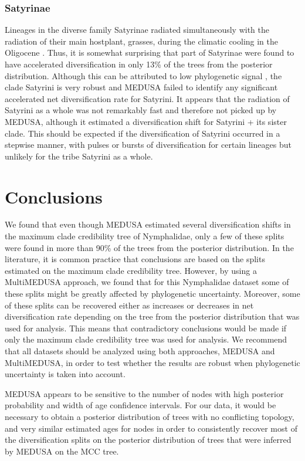 \documentclass[10pt]{article}
\begin{document}
\subsubsection*{Satyrinae}

Lineages in the diverse family Satyrinae radiated simultaneously with
the radiation of their main hostplant, grasses, during the climatic
cooling in the Oligocene \cite{pena2008}. Thus, it is somewhat surprising that
part of Satyrinae were found to have accelerated diversification in only
13\% of the trees from the posterior distribution. Although this can be
attributed to low phylogenetic signal \cite{wahlberg2009}, the clade Satyrini is
very robust \cite{wahlberg2009} and MEDUSA failed to identify any significant
accelerated net diversification rate for Satyrini. It appears that the
radiation of Satyrini as a whole was not remarkably fast and therefore
not picked up by MEDUSA, although it estimated a diversification shift
for Satyrini + its sister clade. This should be expected if the
diversification of Satyrini occurred in a stepwise manner, with pulses
or bursts of diversification for certain lineages but unlikely for the
tribe Satyrini as a whole.

\section*{Conclusions}
We found that even though MEDUSA estimated several diversification
shifts in the maximum clade credibility tree of Nymphalidae, only a few
of these splits were found in more than 90\% of the trees from the
posterior distribution. In the literature, it is common practice that
conclusions are based on the splits estimated on the maximum clade
credibility tree. However, by using a MultiMEDUSA approach, we found
that for this Nymphalidae dataset some of these splits might be greatly
affected by phylogenetic uncertainty. Moreover, some of these splits can
be recovered either as increases or decreases in net diversification
rate depending on the tree from the posterior distribution that was used
for analysis. This means that contradictory conclusions would be made if
only the maximum clade credibility tree was used for analysis. We
recommend that all datasets should be analyzed using both approaches,
MEDUSA and MultiMEDUSA, in order to test whether the results are robust
when phylogenetic uncertainty is taken into account.

MEDUSA appears to be sensitive to the number of nodes with high
posterior probability and width of age confidence intervals. For our
data, it would be necessary to obtain a posterior distribution of trees
with no conflicting topology, and very similar estimated ages for nodes
in order to consistently recover most of the diversification splits on
the posterior distribution of trees that were inferred by MEDUSA on the
MCC tree.
\end{document}
